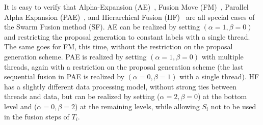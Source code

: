\noindent It is easy to verify that Alpha-Expansion
(AE)~\cite{alpha_expansion}, Fusion Move (FM)~\cite{fusion_moves_for_markov_random_field_optimization}, Parallel
Alpha Expansion (PAE)~\cite{fusion_moves_for_markov_random_field_optimization}, and Hierarchical Fusion
(HF)~\cite{delong_hierarchical_fusion,olga_hierarchical_alpha_expansion} are all special cases of the Swarm
Fusion method (SF). AE can be realized by setting $(\alpha=1, \beta=0)$ and
restricting the proposal generation to constant labels with a single
thread. The same goes for FM, this time, without the restriction on the
proposal generation scheme. PAE is realized by setting
$(\alpha=1,\beta=0)$ with multiple threads, again with a restriction on
the proposal generation scheme (the last sequential fusion in PAE is
realized by $(\alpha=0, \beta=1)$ with a single thread).
%
HF has a slightly different data processing model, without strong ties
between threads and data, but can be realized by setting ($\alpha=2,
\beta=0$) at the bottom level and ($\alpha=0, \beta=2$) at the remaining
levels, while allowing $S_i$ not to be used in the fusion steps of
$T_i$.





%


